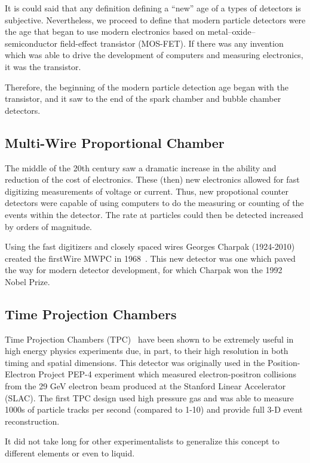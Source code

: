 It is could said that any definition defining a ``new'' age of a types of detectors is subjective.
Nevertheless, we proceed to define that modern particle detectors were the age that began to use modern electronics based on metal–oxide–semiconductor field-effect transistor (MOS-FET).
If there was any invention which was able to drive the development of computers and  measuring electronics, it was the transistor.

Therefore, the beginning of the modern particle detection age began with the transistor, and it saw to the end of the spark chamber and bubble chamber detectors.

\subsection{Multi-Wire Proportional Chamber}

The middle of the 20th century saw a dramatic increase in the ability and reduction of the cost of electronics.
These (then) new electronics allowed for fast digitizing measurements of voltage or current.
Thus, new propotional counter detectors were capable of using computers to do the measuring or counting of the events within the detector.
The rate at particles could then be detected increased by orders of magnitude.

Using the fast digitizers and closely spaced wires Georges Charpak (1924-2010) created the firstWire MWPC in 1968~\citep{Charpak:1968kd}.
This new detector was one which paved the way for modern detector development, for which Charpak won the 1992 Nobel Prize.


\subsection{Time Projection Chambers}

Time Projection Chambers (TPC)~\citep{lartpc:nygren} have been shown to be extremely useful in high energy physics experiments due, in part, to their high resolution in both timing and spatial dimensions.
This detector was originally used in the Position-Electron Project PEP-4 experiment which measured electron-positron collisions from the 29 GeV electron beam produced at the Stanford Linear Accelerator (SLAC).
The first TPC design used high pressure gas and was able to measure 1000s of particle tracks per second (compared to 1-10) and provide full 3-D event reconstruction.


It did not take long for other experimentalists to generalize this concept to different elements or even to liquid.


